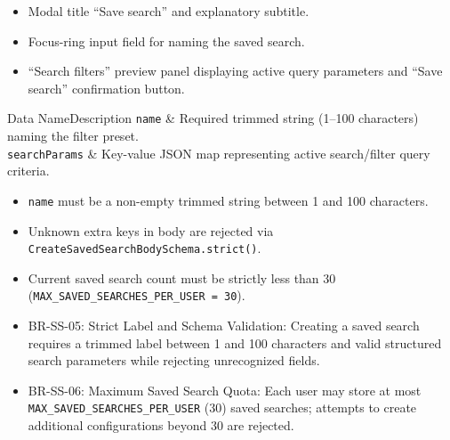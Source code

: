 \begin{itemize}[leftmargin=1.6em,topsep=3pt,itemsep=2pt,parsep=0pt,label=$\bullet$]
    \item Modal title ``Save search'' and explanatory subtitle.
    \item Focus-ring input field for naming the saved search.
    \item ``Search filters'' preview panel displaying active query parameters and ``Save search'' confirmation button.
\end{itemize}


\begin{specdatatable}{Data Name}{Description}
\texttt{name} & Required trimmed string (1--100 characters) naming the filter preset.\\ \hline
\texttt{searchParams} & Key-value JSON map representing active search/filter query criteria.\\ \hline
\end{specdatatable}

\begin{itemize}[leftmargin=1.6em,topsep=3pt,itemsep=2pt,parsep=0pt,label=$\bullet$]
    \item \texttt{name} must be a non-empty trimmed string between 1 and 100 characters.
    \item Unknown extra keys in body are rejected via \texttt{CreateSavedSearchBodySchema.strict()}.
    \item Current saved search count must be strictly less than 30 (\texttt{MAX\_SAVED\_SEARCHES\_PER\_USER = 30}).
\end{itemize}

\begin{itemize}[leftmargin=1.6em,topsep=3pt,itemsep=2pt,parsep=0pt,label=$\bullet$]\brrulelist
    \item BR-SS-05: Strict Label and Schema Validation: Creating a saved search requires a trimmed label between 1 and 100 characters and valid structured search parameters while rejecting unrecognized fields.
    \item BR-SS-06: Maximum Saved Search Quota: Each user may store at most \texttt{MAX\_SAVED\_SEARCHES\_PER\_USER} (30) saved searches; attempts to create additional configurations beyond 30 are rejected.
\end{itemize}

